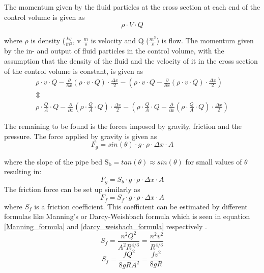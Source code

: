 The momentum given by the fluid particles at the cross section at each end of the control volume is given as
\begin{equation}
	\rho \cdot V \cdot Q
\end{equation}

where $\rho$ is density ($\frac{kg}{m^3}$, v $\frac{m}{s}$ is velocity and Q ($\frac{m^3}{s}$) is flow.
The momentum given by the in- and output of fluid particles in the control volume, with the assumption that the density of the fluid and the velocity of it in the cross section of the control volume is constant, is given as
\begin{equation}
\begin{array}{l}
\rho \cdot v \cdot Q - \frac{\partial}{\partial x}(\rho \cdot v \cdot Q) \cdot \frac{\Delta x}{2} - \left(\rho \cdot v \cdot Q - \frac{\partial}{\partial x}(\rho \cdot v \cdot Q) \cdot \frac{\Delta x}{2} \right) \\
\Updownarrow \\
\rho \cdot \frac{Q}{A} \cdot Q - \frac{\partial}{\partial x}(\rho \cdot \frac{Q}{A}  \cdot Q) \cdot \frac{\Delta x}{2} - \left(\rho \cdot \frac{Q}{A}  \cdot Q - \frac{\partial}{\partial x}(\rho \cdot \frac{Q}{A}  \cdot Q) \cdot \frac{\Delta x}{2} \right)
\end{array}
\label{mass_flow_speed}
\end{equation}

The remaining to be found is the forces imposed by gravity, friction and the pressure.
The force applied by gravity is given as
\begin{equation}
F_g = sin(\theta)\cdot g \cdot \rho \cdot \Delta x \cdot A
\label{gravity_force} 
\end{equation}

where the slope of the pipe bed $\text{S}_\text{b} = tan(\theta) \approx sin(\theta)$ for small values of $\theta$ resulting in:
\begin{equation}
F_g = S_b \cdot g \cdot \rho \cdot \Delta x \cdot A 
\end{equation}
The friction force can be set up similarly as
\begin{equation}
F_f = S_f \cdot g \cdot \rho \cdot \Delta x \cdot A 
\label{friction_force} 
\end{equation}
where $S_f$ is a friction coefficient. This coefficient can be estimated by different formulas like Manning's or Darcy-Weishbach formula which is seen in equation \ref{Manning_formula} and \ref{darcy_weisbach_formula} respectively . 
\begin{equation}
	S_f = \frac{n^2 Q^2}{A^2R^{4/3}}= \frac{n^2 v^2}{R^{4/3}}
\label{Manning_formula}
\end{equation}
\begin{equation}
	S_f = \frac{f Q^2}{8gR A^2}= \frac{f v^2}{8gR}
\label{darcy_weisbach_formula}
\end{equation}

